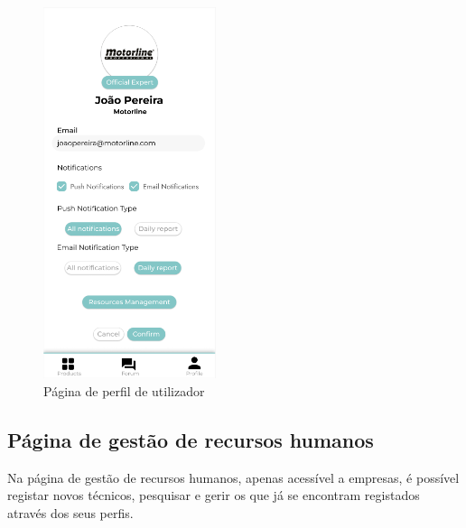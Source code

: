 \begin{figure}[htb]
    \centering
    \includegraphics[width=0.45\textwidth]{images/mockups/user_profile.png}
    \caption{Página de perfil de utilizador}
    \label{fig:30}
\end{figure}

\newpage

\subsection{Página de gestão de recursos humanos}

Na página de gestão de recursos humanos, apenas acessível a empresas, é possível registar novos técnicos, pesquisar e gerir os que já se encontram registados através dos seus perfis.

